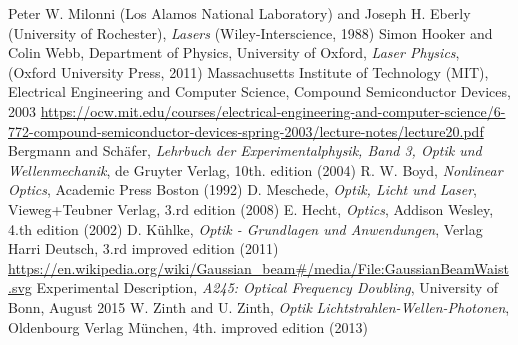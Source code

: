 \documentclass[10pt, a4paper, notitlepage, DIV=15]{scrartcl}
\begin{document}
\begin{thebibliography}{}
	Peter W. Milonni (Los Alamos National Laboratory) and Joseph H. Eberly (University of Rochester), \textit{Lasers} (Wiley-Interscience, 1988)
	Simon Hooker and Colin Webb, Department of Physics, University of Oxford, \textit{Laser Physics}, (Oxford University Press, 2011)
Massachusetts Institute of Technology (MIT), Electrical Engineering and Computer Science, Compound Semiconductor Devices, 2003 \url{https://ocw.mit.edu/courses/electrical-engineering-and-computer-science/6-772-compound-semiconductor-devices-spring-2003/lecture-notes/lecture20.pdf}
	Bergmann and Schäfer, \textit{Lehrbuch der Experimentalphysik, Band 3, Optik und Wellenmechanik}, de Gruyter Verlag, 10th. edition (2004)
	R. W. Boyd, \textit{Nonlinear Optics}, Academic Press Boston (1992)
D. Meschede, \textit{Optik, Licht und Laser}, Vieweg+Teubner Verlag, 3.rd edition (2008)
	E. Hecht, \textit{Optics}, Addison Wesley, 4.th edition (2002)
	D. Kühlke, \textit{Optik - Grundlagen und Anwendungen}, Verlag Harri Deutsch, 3.rd improved edition (2011)
	\url{https://en.wikipedia.org/wiki/Gaussian_beam#/media/File:GaussianBeamWaist.svg}
	Experimental Description, \textit{A245: Optical Frequency Doubling}, University of Bonn, August 2015
	W. Zinth and U. Zinth, \textit{Optik} \textit{Lichtstrahlen-Wellen-Photonen}, Oldenbourg Verlag München, 4th. improved edition (2013)
	

\end{thebibliography}
 
\end{document}
